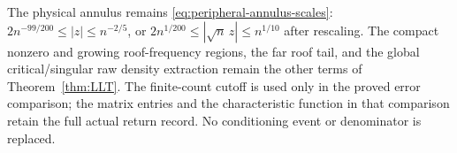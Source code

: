 The physical annulus remains \eqref{eq:peripheral-annulus-scales}:
$2n^{-99/200}\le|z|\le n^{-2/5}$, or
$2n^{1/200}\le|\sqrt n\,z|\le n^{1/10}$ after rescaling.
The compact nonzero and growing roof-frequency regions, the far roof
tail, and the global critical/singular raw density extraction remain
the other terms of Theorem~\ref{thm:LLT}. The finite-count cutoff is
used only in the proved error comparison; the matrix entries and the
characteristic function in that comparison retain the full actual
return record. No conditioning event or denominator is replaced.

